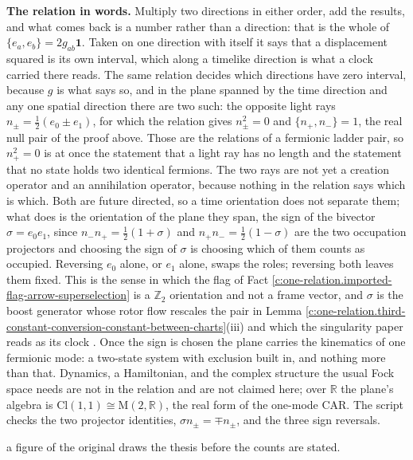 \documentclass[11pt]{article}
\theoremstyle{definition}
\theoremstyle{plain}
\providecommand{\Cl}{}\renewcommand{\Cl}{\mathrm{Cl}}
\providecommand{\Mat}{}\renewcommand{\Mat}{\mathrm{M}}
\providecommand{\R}{}\renewcommand{\R}{\mathbb{R}}
\begin{document}
\label{c:note.one-relation.setting-two-presentations}
\textbf{The relation in words.} Multiply two directions in either order, add the results, and what comes back is a number rather than a direction: that is the whole of $\{e_{a}, e_{b}\} = 2g_{ab}\mathbf{1}$. Taken on one direction with itself it says that a displacement squared is its own interval, which along a timelike direction is what a clock carried there reads. The same relation decides which directions have zero interval, because $g$ is what says so, and in the plane spanned by the time direction and any one spatial direction there are two such: the opposite light rays $n_{\pm} = \tfrac12(e_{0} \pm e_{1})$, for which the relation gives $n_{\pm}^{2} = 0$ and $\{n_{+}, n_{-}\} = 1$, the real null pair of the proof above. Those are the relations of a fermionic ladder pair, so $n_{+}^{2} = 0$ is at once the statement that a light ray has no length and the statement that no state holds two identical fermions. The two rays are not yet a creation operator and an annihilation operator, because nothing in the relation says which is which. Both are future directed, so a time orientation does not separate them; what does is the orientation of the plane they span, the sign of the bivector $\sigma = e_{0}e_{1}$, since $n_{-}n_{+} = \tfrac12(1 + \sigma)$ and $n_{+}n_{-} = \tfrac12(1 - \sigma)$ are the two occupation projectors and choosing the sign of $\sigma$ is choosing which of them counts as occupied. Reversing $e_{0}$ alone, or $e_{1}$ alone, swaps the roles; reversing both leaves them fixed. This is the sense in which the flag of Fact \ref{c:one-relation.imported-flag-arrow-superselection} is a $\mathbb{Z}_{2}$ orientation and not a frame vector, and $\sigma$ is the boost generator whose rotor flow rescales the pair in Lemma \ref{c:one-relation.third-constant-conversion-constant-between-charts}(iii) and which the singularity paper reads as its clock \cite{ButlerT5}. Once the sign is chosen the plane carries the kinematics of one fermionic mode: a two-state system with exclusion built in, and nothing more than that. Dynamics, a Hamiltonian, and the complex structure the usual Fock space needs are not in the relation and are not claimed here; over $\R$ the plane's algebra is $\Cl(1,1) \cong \Mat(2, \R)$, the real form of the one-mode CAR. The script checks the two projector identities, $\sigma n_{\pm} = \mp n_{\pm}$, and the three sign reversals.

\label{c:note.one-relation.setting-two-presentations-2}
a figure of the original draws the thesis before the counts are stated.
\end{document}
